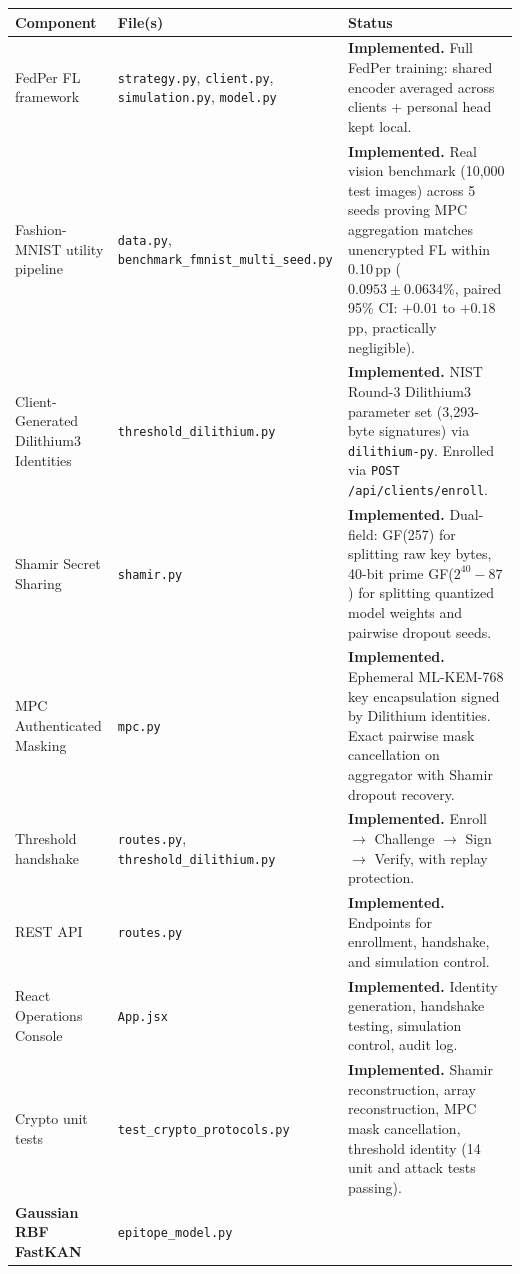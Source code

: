 \documentclass[11pt,a4paper]{article}
\begin{document}
\begin{center}
\begin{longtable}{@{}p{3.6cm}p{4.0cm}p{6.6cm}@{}}
\toprule
\textbf{Component} & \textbf{File(s)} & \textbf{Status} \\
\midrule
\endhead
FedPer FL framework & \lstinline|strategy.py|, \lstinline|client.py|,
\lstinline|simulation.py|, \lstinline|model.py| & \textbf{Implemented.} Full
FedPer training: shared encoder averaged across clients + personal head
kept local. \\
Fashion-MNIST utility pipeline & \lstinline|data.py|, \lstinline|benchmark_fmnist_multi_seed.py| &
\textbf{Implemented.} Real vision benchmark (10{,}000 test images) across 5 seeds proving MPC aggregation matches unencrypted FL within 0.10\,pp ($0.0953 \pm 0.0634\%$, paired 95\% CI: $+0.01$ to $+0.18$ pp, practically negligible). \\
Client-Generated Dilithium3 Identities & \lstinline|threshold_dilithium.py| &
\textbf{Implemented.} NIST Round-3 Dilithium3 parameter set (3{,}293-byte signatures) via \lstinline|dilithium-py|. Enrolled via \lstinline|POST /api/clients/enroll|. \\
Shamir Secret Sharing & \lstinline|shamir.py| & \textbf{Implemented.}
Dual-field: GF(257) for splitting raw key bytes, 40-bit prime GF($2^{40}{-}87$) for
splitting quantized model weights and pairwise dropout seeds. \\
MPC Authenticated Masking & \lstinline|mpc.py| & \textbf{Implemented.} Ephemeral ML-KEM-768 key encapsulation signed by Dilithium identities. Exact pairwise mask cancellation on aggregator with Shamir dropout recovery. \\
Threshold handshake & \lstinline|routes.py|,
\lstinline|threshold_dilithium.py| & \textbf{Implemented.} Enroll
$\to$ Challenge $\to$ Sign $\to$ Verify, with replay protection. \\
REST API & \lstinline|routes.py| & \textbf{Implemented.} Endpoints for
enrollment, handshake, and simulation control. \\
React Operations Console & \lstinline|App.jsx| & \textbf{Implemented.}
Identity generation, handshake testing, simulation control, audit log. \\
Crypto unit tests & \lstinline|test_crypto_protocols.py| &
\textbf{Implemented.} Shamir reconstruction, array reconstruction, MPC mask
cancellation, threshold identity (14 unit and attack tests passing). \\
\textbf{Gaussian RBF FastKAN} & \lstinline|epitope_model.py| &

\end{longtable}
\end{center}
\end{document}
